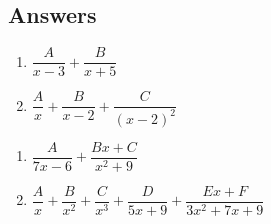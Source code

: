 \newpage

\subsection{Answers}

\begin{multicols}{2}
\begin{enumerate}

\item $\dfrac{A}{x - 3} + \dfrac{B}{x + 5}$
\item $\dfrac{A}{x} + \dfrac{B}{x - 2} + \dfrac{C}{(x - 2)^{2}}$

\setcounter{HW}{\value{enumi}}
\end{enumerate}
\end{multicols}

\begin{multicols}{2}
\begin{enumerate}
\setcounter{enumi}{\value{HW}}

\item $\dfrac{A}{7x - 6} + \dfrac{Bx + C}{x^{2} + 9}$
\item $\dfrac{A}{x} + \dfrac{B}{x^{2}} + \dfrac{C}{x^{3}} + \dfrac{D}{5x + 9} + \dfrac{Ex + F}{3x^{2} + 7x + 9}$

\setcounter{HW}{\value{enumi}}
\end{enumerate}
\end{multicols}

